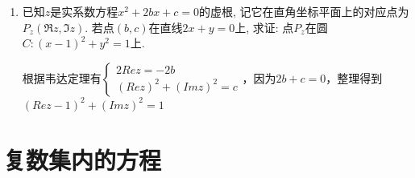 \begin{enumerate}
    \item 已知$z$是实系数方程$x^2+2bx+c=0$的虚根, 记它在直角坐标平面上的对应点为$P_z(\Re{z},\Im{z})$. 
    若点$(b,c)$在直线$2x+y=0$上, 求证: 点$P_z$在圆$C: (x-1)^2+y^2=1$上. 
    \begin{jieda}
        根据韦达定理有$\left\{\begin{array}{l}
             2Rez = -2b\\
             (Rez)^2 + (Imz)^2 = c
        \end{array}\right.$，因为$2b+c = 0$，整理得到$(Rez-1)^2+(Imz)^2=1$
    \end{jieda}
    
\end{enumerate}


\section{复数集内的方程}
